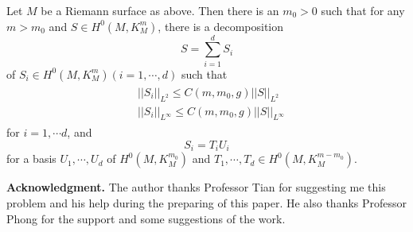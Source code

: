 \begin{theorem}
Let $M$ be a Riemann surface
as above.
Then there is an $m_0>0$ such that for any $m>m_0$ and $S\in
H^0(M,K_M^m)$,
there is a decomposition
\[
S=\sum_{i=1}^d S_i
\]
of $S_i\in H^0(M,K_M^m) (i=1,\cdots, d)$
such that
\begin{align}
\begin{split}
&||S_i||_{L^2}\leq C(m,m_0,g)||S||_{L^2}\\
&||S_i||_{L^\infty}\leq C(m,m_0,g)||S||_{L^\infty}
\end{split}
\end{align}
for $i=1,\cdots d$,
and
\[
S_i=T_iU_i
\]
for a basis $U_1,\cdots,U_d$ of $H^0(M,K_M^{m_0})$
and $T_1,\cdots,T_d\in H^0(M,K_M^{m-m_0})$.
\end{theorem}



{\bf Acknowledgment.} The author thanks Professor Tian for
suggesting me this problem and
 his help during 
the preparing of this paper. He also thanks Professor Phong for the
support
and some suggestions of the work.

